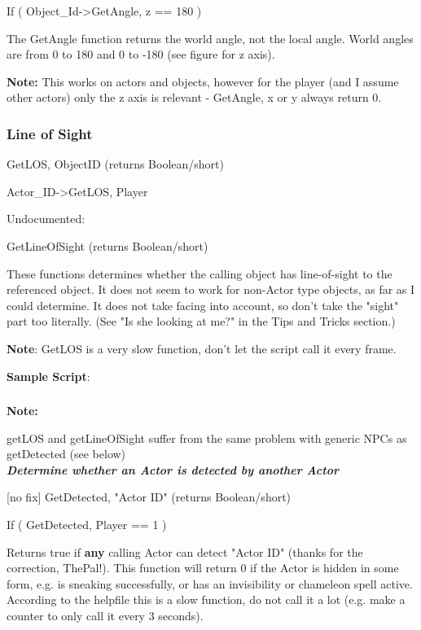 \documentclass[
]{article}
\begin{document}
If ( Object\_Id-\textgreater GetAngle, z == 180 )

The GetAngle function returns the world angle, not the local angle.
World angles are from 0 to 180 and 0 to -180 (see figure for z axis).

\textbf{Note:} This works on actors and objects, however for the player
(and I assume other actors) only the z axis is relevant - GetAngle, x or
y always return 0.

\hypertarget{line-of-sight}{%
\subsubsection{Line of Sight}\label{line-of-sight}}

GetLOS, ObjectID (returns Boolean/short)

Actor\_ID-\textgreater GetLOS, Player

Undocumented:

GetLineOfSight (returns Boolean/short)

These functions determines whether the calling object has line-of-sight
to the referenced object. It does not seem to work for non-Actor type
objects, as far as I could determine. It does not take facing into
account, so don't take the "sight" part too literally. (See "Is she
looking at me?" in the Tips and Tricks section.)

\textbf{Note}: GetLOS is a very slow function, don't let the script call
it every frame.

\textbf{Sample Script}:



\hypertarget{section-2}{%
\subsubsection{}\label{section-2}}

\textbf{Note:}

getLOS and getLineOfSight suffer from the same problem with generic NPCs
as getDetected (see below)\\
\protect\hypertarget{_Toc182634542}{}{}\emph{\textbf{Determine whether
an Actor is detected by another Actor}}

{[}no fix{]} GetDetected, "Actor ID" (returns Boolean/short)

If ( GetDetected, Player == 1 )

Returns true if \textbf{any} calling Actor can detect "Actor ID" (thanks
for the correction, ThePal!). This function will return 0 if the Actor
is hidden in some form, e.g. is sneaking successfully, or has an
invisibility or chameleon spell active. According to the helpfile this
is a slow function, do not call it a lot (e.g. make a counter to only
call it every 3 seconds).
\end{document}
